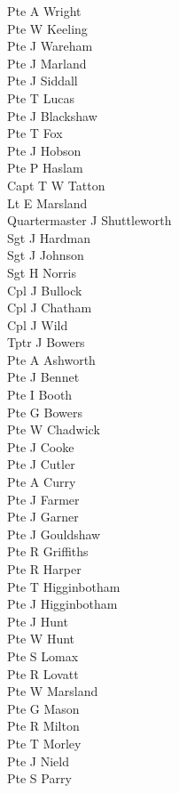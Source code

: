 \begin{multicols}{2}
  Pte A Wright \\
  Pte W Keeling \\
  Pte J Wareham \\
  Pte J Marland \\
  Pte J Siddall \\
  Pte T Lucas \\
  Pte J Blackshaw \\
  Pte T Fox \\
  Pte J Hobson \\
  Pte P Haslam \\
  Capt T W Tatton \\
  Lt E Marsland \\
  Quartermaster J Shuttleworth \\
  Sgt J Hardman \\
  Sgt J Johnson \\
  Sgt H Norris \\
  Cpl J Bullock \\
  Cpl J Chatham \\
  Cpl J Wild \\
  Tptr J Bowers \\
  Pte A Ashworth \\
  Pte J Bennet \\
  Pte I Booth \\
  Pte G Bowers \\
  Pte W Chadwick \\
  Pte J Cooke \\
  Pte J Cutler \\
  Pte A Curry \\
  Pte J Farmer \\
  Pte J Garner \\
  Pte J Gouldshaw \\
  Pte R Griffiths \\
  Pte R Harper \\
  Pte T Higginbotham \\
  Pte J Higginbotham \\
  Pte J Hunt \\
  Pte W Hunt \\
  Pte S Lomax \\
  Pte R Lovatt \\
  Pte W Marsland \\
  Pte G Mason \\
  Pte R Milton \\
  Pte T Morley \\
  Pte J Nield \\
  Pte S Parry \\

\end{multicols}
